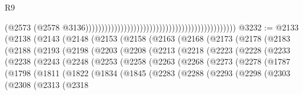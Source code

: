\begin{lexlean}{R9}
\begin{coremodule}
{{{{{{{{{{{{{{{{{{{{{{{{{{{{{{{{{{{{{{{{{{{{{{{{{{{{{{{{{{{{{{{{{{{{{{{{{{{{{{{{{{{{{{{{{{{{{{{{{{{{{{{{{{{{                                                                                              (@2573
                                                                                                (@2578
                                                                                                  @3136)))))))))))))))))))))))))))))))))))))))))))))))
@3232 := @2133
    (@2138
      (@2143
        (@2148
          (@2153
            (@2158
              (@2163
                (@2168
                  (@2173
                    (@2178
                      (@2183
                        (@2188
                          (@2193
                            (@2198
                              (@2203
                                (@2208
                                  (@2213
                                    (@2218
                                      (@2223
                                        (@2228
                                          (@2233
                                            (@2238
                                              (@2243
                                                (@2248
                                                  (@2253
                                                    (@2258
                                                      (@2263
                                                        (@2268
                                                          (@2273
                                                            (@2278
                                                              (@1787
                                                                (@1798
                                                                  (@1811
                                                                    (@1822
                                                                      (@1834
                                                                        (@1845
                                                                          (@2283
                                                                            (@2288
                                                                              (@2293
                                                                                (@2298
                                                                                  (@2303
                                                                                    (@2308
                                                                                      (@2313
                                                                                        (@2318
}}}}}}}}}}}}}}}}}}}}}}}}}}}}}}}}}}}}}}}}}}}}}}}}}}}}}}}}}}}}}}}}}}}}}}}}}}}}}}}}}}}}}}}}}}}}}}}}}}}}}}}}}}}}
\end{coremodule}
\end{lexlean}
